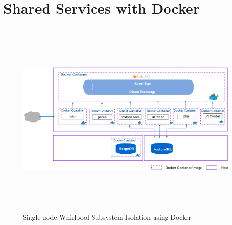 \section{Shared Services with Docker}
\begin{figure}[h!]
  \centering
  \includegraphics[width=18cm,height=10cm,keepaspectratio]{../media/crawler/multi-container-deploy.png}
  \caption{Single-node Whirlpool Subsystem Isolation using Docker}
  \label{fig:multicontainer}
\end{figure}

